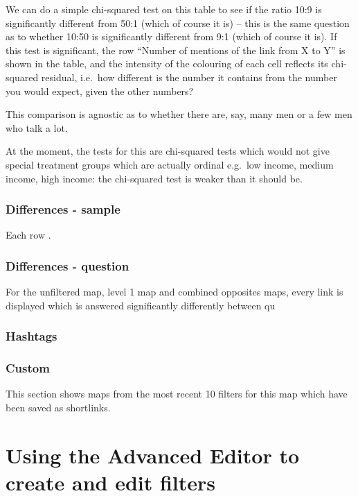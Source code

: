 \documentclass[
]{book}
\begin{document}
We can do a simple chi-squared test on this table to see if the ratio 10:9 is significantly different from 50:1 (which of course it is) -- this is the same question as to whether 10:50 is significantly different from 9:1 (which of course it is). If this test is significant, the row ``Number of mentions of the link from X to Y'' is shown in the table, and the intensity of the colouring of each cell reflects its chi-squared residual, i.e.~how different is the number it contains from the number you would expect, given the other numbers?

This comparison is agnostic as to whether there are, say, many men or a few men who talk a lot.

At the moment, the tests for this are chi-squared tests which would not give special treatment groups which are actually ordinal e.g.~low income, medium income, high income: the chi-squared test is weaker than it should be.

\hypertarget{differences---sample-1}{%
\subsection{Differences - sample}\label{differences---sample-1}}

Each row .

\hypertarget{differences---question}{%
\subsection{Differences - question}\label{differences---question}}

For the unfiltered map, level 1 map and combined opposites maps, every link is displayed which is answered significantly differently between qu

\hypertarget{hashtags}{%
\subsection{Hashtags}\label{hashtags}}

\hypertarget{custom}{%
\subsection{Custom}\label{custom}}

This section shows maps from the most recent 10 filters for this map which have been saved as shortlinks.

\hypertarget{advanced-editor}{%
\chapter{Using the Advanced Editor to create and edit filters}\label{advanced-editor}}
\end{document}
